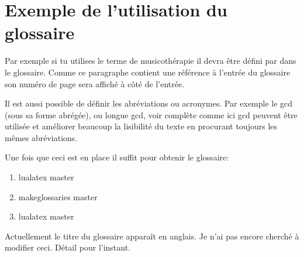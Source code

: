\chapter{Exemple de l'utilisation du glossaire}

Par exemple si tu utilises
le terme de \gls{musicothérapie} il devra être 
défini par dans le glossaire. Comme ce paragraphe
contient une référence à l'entrée du glossaire son
numéro de page sera affiché à côté de l'entrée.

Il est aussi possible de définir les abréviations ou
acronymes. Par exemple le \acrshort{gcd} (sous sa forme
abrégée), ou longue \acrlong{gcd}, voir complète comme
ici \acrfull{gcd} peuvent être utilisée et améliorer
beaucoup la lisibilité du texte en procurant
toujours les mêmes abréviations.

Une fois que ceci est en place il suffit pour obtenir le glossaire:
\begin{enumerate}
\item lualatex master
\item makeglossaries master
\item lualatex master
\end{enumerate}

Actuellement le titre du glossaire apparaît en anglais. Je n'ai pas
encore cherché à modifier ceci. Détail pour l'instant.
